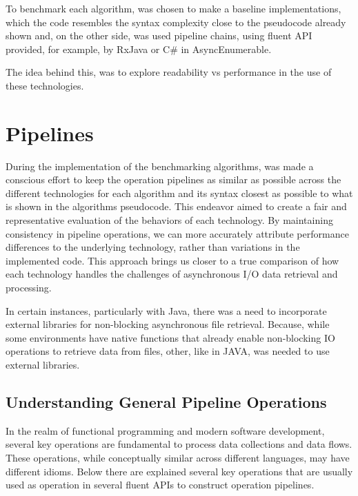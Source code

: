 To benchmark each algorithm, was chosen to make a baseline implementations, which the code resembles the syntax complexity close to the pseudocode already shown and, on the other side, was used pipeline chains, using fluent API provided, for example, by RxJava or C\# in AsyncEnumerable.

The idea behind this, was to explore readability vs performance in the use of these technologies.


\section{Pipelines}
\label{sec:pipeline_implementations}

During the implementation of the benchmarking algorithms, was made a conscious effort to keep the operation pipelines as similar as possible across the different technologies for each algorithm and its syntax closest as possible to what is shown in the algorithms pseudocode. This endeavor aimed to create a fair and representative evaluation of the behaviors of each technology. By maintaining consistency in pipeline operations, we can more accurately attribute performance differences to the underlying technology, rather than variations in the implemented code. This approach brings us closer to a true comparison of how each technology handles the challenges of asynchronous I/O data retrieval and processing.

In certain instances, particularly with Java, there was a need to incorporate external libraries for non-blocking asynchronous file retrieval. Because, while some environments have native functions that already enable non-blocking IO operations to retrieve data from files, other, like in JAVA, was needed to use external libraries.


\subsection{Understanding General Pipeline Operations}
\label{sec:understanding_pipeline_operations}

In the realm of functional programming and modern software development, several key operations are fundamental to process data collections and data flows. These operations, while conceptually similar across different languages, may have different idioms. Below there are explained several key operations that are usually used as operation in several fluent APIs to construct operation pipelines.  \cite{JAVASTREAMAPI} \cite{JSPROMISES} \cite{DOTNET_ASYNC_ENUM} \cite{LINQ}

